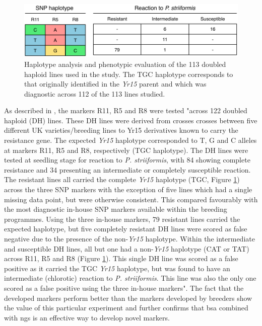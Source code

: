 \begin{figure}
\includegraphics[width=1\textwidth]{Yr15/Figures/breedersTest.pdf}
\caption{Haplotype analysis and phenotypic evaluation of the 113 doubled haploid lines used in the study. The TGC haplotype corresponds to that originally identified in the \textit{Yr15} parent and which was diagnostic across 112 of the 113 lines studied.}
\label{fig:yr15:breeders}
\end{figure}

As described in \citet{Ramirez-Gonzalez2015b}, the markers
 R11, R5 and R8 were tested "across 122 doubled haploid (DH) lines. 
These DH lines were derived from crosses crosses between five different UK varieties/breeding lines to Yr15 derivatives known to carry the resistance gene. 
The expected \textit{Yr15} haplotype corresponded to T, G and C alleles at markers R11, R5 and R8, respectively (TGC haplotype). 
The DH lines were tested at seedling stage for reaction to \textit{P. striiformis}, with 84 showing complete resistance and 34 presenting an intermediate or completely susceptible reaction.
The resistant lines all carried the complete \textit{Yr15} haplotype (TGC, Figure \ref{fig:yr15:breeders}) across the three SNP markers with the exception of five lines which had a single missing data point, but were otherwise consistent. 
This compared favourably with the most diagnostic in-house SNP markers available within the breeding programmes. 
Using the three in-house markers, 79 resistant lines carried the expected haplotype, but five completely resistant DH lines were scored as false negative due to the presence of the non-\textit{Yr15} haplotype. 
Within the intermediate and susceptible DH lines, all but one had a non-\textit{Yr15} haplotype (CAT or TAT) across R11, R5 and R8 (Figure \ref{fig:yr15:breeders}). This single DH line was scored as a false positive as it carried the TGC \textit{Yr15} haplotype, but was found to have an intermediate (chlorotic) reaction to \textit{P. striiformis}. This line was also the only one scored as a false positive using the three in-house markers". 
The fact that the developed markers perform better than the markers developed by breeders show the value of this particular experiment and further confirms that \acrshort{bsa} combined with \acrshort{ngs} is an effective way to develop novel markers. 
